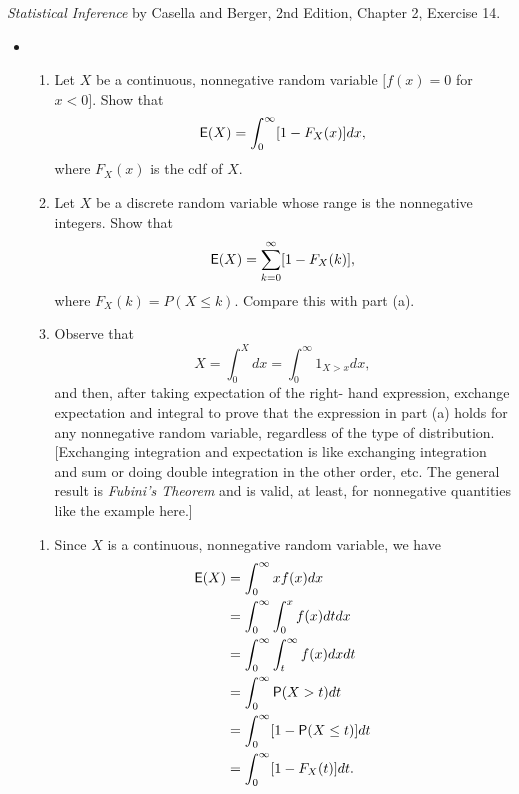 \documentclass[12pt]{article}
\newcommand{\Prob}{{\sf P}}
\newcommand{\E}{{\sf E}}
\newenvironment{problem}[2][Problem]{\begin{trivlist}
\item[\hskip \labelsep {\bfseries #1}\hskip \labelsep {\bfseries #2.}]}
{\end{trivlist}}
\begin{document}
\begin{problem}{2}
  \textit{Statistical Inference} by Casella and Berger, 2nd Edition, Chapter 2, 
  Exercise 14.
  \begin{itemize}
    \item [14.] \begin{enumerate}
      \item Let $X$ be a continuous, nonnegative random variable
        $[f(x) = 0$ for $x <0]$. Show that
        \[
          \E(X) = \int_0^\infty [1- F_X(x)]dx,
        \]
        where $F_X(x)$ is the cdf of $X$.
      \item Let $X$ be a discrete random variable whose range is
      the nonnegative integers. Show that
      \[
        \E(X) = \sum_{k=0}^\infty [1- F_X(k)],
      \]
      where $F_X(k) = P(X \leq k)$. Compare this with part (a).
      \item Observe that
      \[
        X = \int_0^Xdx = \int_0^\infty 1_{X>x} dx,
      \]
      and then, after taking expectation of the right-
      hand expression, exchange expectation and integral to prove that the 
      expression in part (a) holds for any nonnegative random variable, 
      regardless of the type of distribution. [Exchanging integration and 
      expectation is like exchanging integration and sum or doing
      double integration in the other order, etc. The general result is
      \textit{Fubini's Theorem} and
      is valid, at least, for nonnegative quantities like the example here.]
    \end{enumerate}
    \begin{enumerate}
      \item Since $X$ is a continuous, nonnegative random variable, we have
      \[
        \begin{aligned}
          \E(X) &= \int_0^\infty x f(x) dx \\
          &= \int_0^\infty \int_0^x f(x) dt dx \\
          &= \int_0^\infty \int_t^\infty f(x) dx dt \\
          &= \int_0^\infty \Prob(X > t) dt \\
          &= \int_0^\infty [1 - \Prob(X \leq t)] dt\\
          &= \int_0^\infty [1 - F_X(t)] dt.
        \end{aligned}
      \]
      

\end{enumerate}
\end{itemize}
\end{problem}
\end{document}

